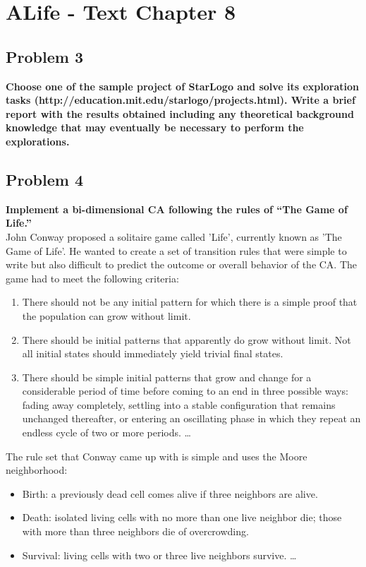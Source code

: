 
\chapter{ALife - Text Chapter 8}

\section{ Problem 3 }
\textbf{ Choose one of the sample project of StarLogo and solve its exploration tasks (http://education.mit.edu/starlogo/projects.html). Write a brief report with the results obtained including any theoretical background knowledge that may eventually be necessary to perform the explorations. } 

\section{ Problem 4 }
\textbf{ Implement a bi-dimensional CA following the rules of ``The Game of Life.'' }\\
\newline
John Conway proposed a solitaire game called 'Life', currently known as 'The Game of Life'. He wanted to create a set of transition rules that were simple to write but also difficult to predict the outcome or overall behavior of the CA. The game had to meet the following criteria:

\begin{enumerate}
	\item There should not be any initial pattern for which there is a simple proof that the population can grow without limit.
	\item There should be initial patterns that apparently do grow without limit. Not all initial states should immediately yield trivial final states.
	\item There should be simple initial patterns that grow and change for a considerable period of time before coming to an end in three possible ways: fading away completely, settling into a stable configuration that remains unchanged thereafter, or entering an oscillating phase in which they repeat an endless cycle of two or more periods.
	\dots
\end{enumerate}

The rule set that Conway came up with is simple and uses the Moore neighborhood:
\begin{itemize}
    \item Birth: a previously dead cell comes alive if three neighbors are alive.
    \item Death: isolated living cells with no more than one live neighbor die; those with more than three neighbors die of overcrowding.
    \item Survival: living cells with two or three live neighbors survive.
	\dots
\end{itemize}

